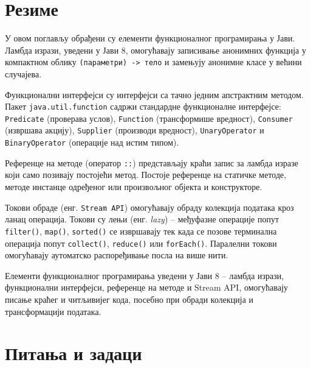 \section{Резиме}

У овом поглављу обрађени су елементи функционалног програмирања у Јави. Ламбда изрази, уведени у Јави 8, омогућавају записивање анонимних функција у компактном облику \texttt{(параметри) -\textgreater{} тело} и замењују анонимне класе у већини случајева.

Функционални интерфејси су интерфејси са тачно једним апстрактним методом. Пакет \texttt{java.util.function} садржи стандардне функционалне интерфејсе: \texttt{Predicate} (проверава услов), \texttt{Function} (трансформише вредност), \texttt{Consumer} (извршава акцију), \texttt{Supplier} (производи вредност), \texttt{UnaryOperator} и \texttt{BinaryOperator} (операције над истим типом).

Референце на методе (оператор \texttt{::}) представљају краћи запис за ламбда изразе који само позивају постојећи метод. Постоје референце на статичке методе, методе инстанце одређеног или произвољног објекта и конструкторе.

Токови обраде (енг. \texttt{Stream API}) омогућавају обраду колекција података кроз ланац операција. Токови су лењи (енг. \textit{lazy}) – међуфазне операције попут \texttt{filter()}, \texttt{map()}, \texttt{sorted()} се извршавају тек када се позове терминална операција попут \texttt{collect()}, \texttt{reduce()} или \texttt{forEach()}. Паралелни токови омогућавају аутоматско распоређивање посла на више нити.

Елементи функционалног програмирања уведени у Јави 8 – ламбда изрази, функционални интерфејси, референце на методе и Stream API, омогућавају писање краћег и читљивијег кода, посебно при обради колекција и трансформацији података.


\section{Питања и задаци}

